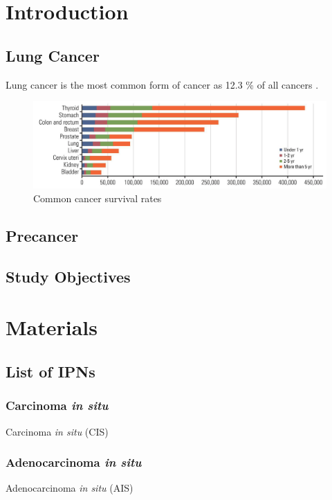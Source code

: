 \documentclass[11pt,a4paper,onecolumn,oneside]{report}
\begin{document}
    \setcounter{page}{1}

    \section{Introduction}
        \subsection{Lung Cancer}
            Lung cancer is the most common form of cancer as 12.3 \% of all cancers \cite{lung3}.

            \begin{figure}[p]
                \centering
                \includegraphics[width=0.8 \linewidth]{figures/LungCancer/rate.png}
                \caption{Common cancer survival rates \protect\cite{lung6}}
                \label{fig:cancer-survival}
            \end{figure}

        \subsection{Precancer}

        \subsection{Study Objectives}
    \newpage

    \section{Materials}
        \subsection{List of IPNs}
            \subsubsection{Carcinoma \textit{in situ}}
                Carcinoma \textit{in situ} (CIS)

            \subsubsection{Adenocarcinoma \textit{in situ}}
                Adenocarcinoma \textit{in situ} (AIS)
\end{document}
